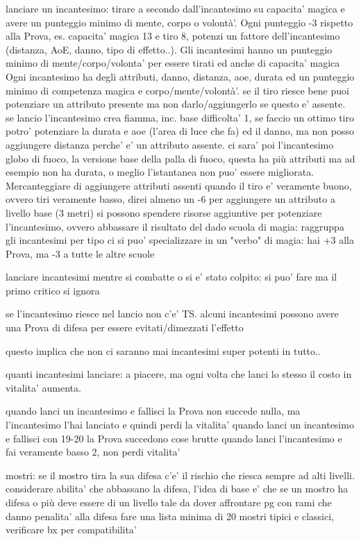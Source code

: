 \documentclass[12pt,a4paper,twoside,openany]{book}
\begin{document}
lanciare un incantesimo: tirare a secondo dall'incantesimo su capacita' magica e avere un punteggio minimo di  mente, corpo o volontà'.  Ogni punteggio -3 rispetto alla Prova, es. capacita' magica 13 e tiro 8, potenzi un fattore dell'incantesimo (distanza, AoE, danno, tipo di effetto..). Gli incantesimi hanno un punteggio minimo di mente/corpo/volonta' per essere tirati ed anche di capacita' magica
Ogni incantesimo ha degli attributi, danno, distanza, aoe, durata ed un punteggio minimo di competenza magica e corpo/mente/volontà'. se il tiro riesce bene puoi potenziare un attributo presente ma non darlo/aggiungerlo se questo e' assente. se lancio l'incantesimo crea fiamma, inc. base difficolta' 1, se faccio un ottimo tiro potro' potenziare la durata e aoe (l'area di luce che fa) ed il danno, ma non posso aggiungere distanza perche' e' un attributo assente.
ci sara' poi l'incantesimo globo di fuoco, la versione base della palla di fuoco, questa ha più attributi ma ad esempio non ha durata, o meglio l'istantanea non puo' essere migliorata.
Mercanteggiare di aggiungere attributi assenti quando il tiro e' veramente buono, ovvero tiri veramente basso, direi almeno un -6 per aggiungere un attributo a livello base (3 metri)
si possono spendere risorse aggiuntive per potenziare l'incantesimo, ovvero abbassare il risultato del dado
scuola di magia: raggruppa gli incantesimi per tipo
ci si puo' specializzare in un "verbo" di magia: hai +3 alla Prova, ma -3 a tutte le altre scuole

lanciare incantesimi mentre si combatte o si e' stato colpito: si puo' fare ma il primo critico si ignora

se l'incantesimo riesce nel lancio non c'e' TS. alcuni incantesimi possono avere una Prova di difesa per essere evitati/dimezzati l'effetto

questo implica che non ci saranno mai incantesimi super potenti in tutto..

quanti incantesimi lanciare:  a piacere, ma ogni volta che lanci lo stesso il costo in vitalita' aumenta. 

quando lanci un incantesimo e fallisci la Prova non succede nulla, ma l'incantesimo l'hai lanciato e quindi perdi la vitalita' 
quando lanci un incantesimo e fallisci con 19-20 la Prova succedono cose  brutte
quando lanci l'incantesimo e fai veramente basso 2, non perdi vitalita'


mostri:
se il mostro tira la sua difesa c'e' il rischio che riesca sempre ad alti livelli. considerare abilita' che abbassano la difesa, l'idea di base e' che se un mostro ha difesa  o più deve essere di un livello tale da dover affrontare pg con rami che danno penalita' alla difesa
fare una lista minima di 20 mostri tipici e classici, verificare bx per compatibilita'
\end{document}
